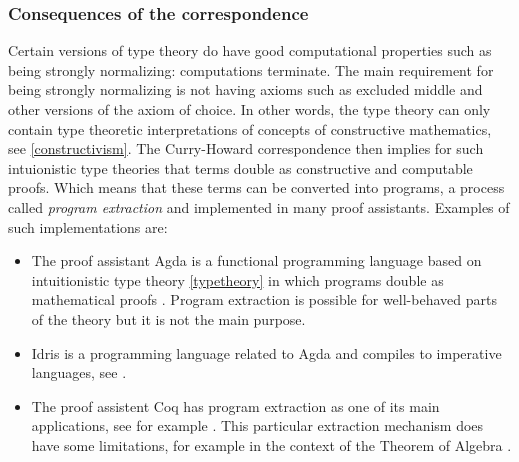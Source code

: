 \documentclass[12pt,a4paper,twoside,xetex,draft]{book}
\newcommand{\keyword}[1]{\emph{#1}\index{#1}}
\begin{document}
\subsubsection{Consequences of the correspondence}

Certain versions of type theory do have good computational properties such as being strongly normalizing: computations terminate. The main requirement for being strongly normalizing is not having axioms such as excluded middle and other versions of the axiom of choice. In other words, the type theory can only contain type theoretic interpretations of concepts of constructive mathematics, see \cref{constructivism}. The Curry-Howard correspondence then implies for such intuionistic type theories that terms double as constructive and computable proofs. Which means that these terms can be converted into programs, a process called \keyword{program extraction} and implemented in many proof assistants. Examples of such implementations are:
\begin{itemize}
\item The proof assistant Agda is a functional programming language based on intuitionistic type theory \cref{typetheory} in which programs double as mathematical proofs \cite{Abel2019}. Program extraction is possible for well-behaved parts of the theory but it is not the main purpose.
\item Idris is a programming language related to Agda and compiles to imperative languages, see \cite{Brady2018}.
\item   The proof assistent Coq \cite{Arias2019} has program extraction as one of its main applications, see for example \cite{Pit-Claudel2018}. This particular extraction mechanism does have some limitations, for example in the context of the Theorem of Algebra \cite{Cruz-Filipe2005}. %
\end{itemize}

%

\end{document}
